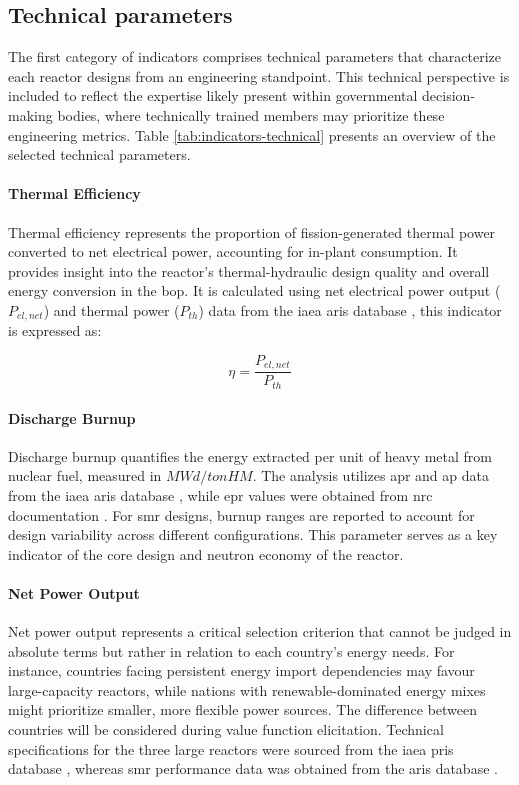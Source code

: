\subsection{Technical parameters}
The first category of indicators comprises technical parameters that characterize each reactor designs from an engineering standpoint. This technical perspective is included to reflect the expertise likely present within governmental decision-making bodies, where technically trained members may prioritize these engineering metrics. Table \ref{tab:indicators-technical} presents an overview of the selected technical parameters.

\paragraph{Thermal Efficiency}
Thermal efficiency represents the proportion of fission-generated thermal power converted to net electrical power, accounting for in-plant consumption. It provides insight into the reactor's thermal-hydraulic design quality and overall energy conversion in the \gls{bop}. It is calculated using net electrical power output ($P_{el,net}$) and thermal power ($P_{th}$) data from the \gls{iaea} \gls{aris} database \cite{iaea2025aris}, this indicator is expressed as:

$$
\eta = \frac{P_{el,net}}{P_{th}}
$$

\paragraph{Discharge Burnup}
Discharge burnup quantifies the energy extracted per unit of heavy metal from nuclear fuel, measured in $MWd/tonHM$. The analysis utilizes \gls{apr} and \gls{ap} data from the \gls{iaea} \gls{aris} database \cite{iaea2025aris}, while \gls{epr} values were obtained from \gls{nrc} documentation \cite{NRC_ML052280170}. For \gls{smr} designs, burnup ranges are reported to account for design variability across different configurations. This parameter serves as a key indicator of the core design and neutron economy of the reactor.


\paragraph{Net Power Output}
Net power output represents a critical selection criterion that cannot be judged in absolute terms but rather in relation to each country's energy needs. For instance, countries facing persistent energy import dependencies may favour large-capacity reactors, while nations with renewable-dominated energy mixes might prioritize smaller, more flexible power sources. The difference between countries will be considered during value function elicitation. Technical specifications for the three large reactors were sourced from the \gls{iaea} \gls{pris} database \cite{IAEA_PRIS_2025}, whereas \gls{smr} performance data was obtained from the \gls{aris} database \cite{iaea2025aris}.

